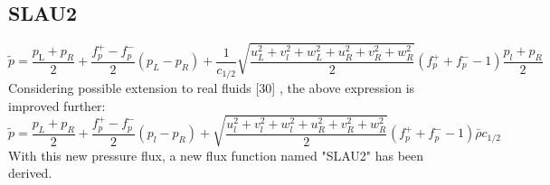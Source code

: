 \subsection{SLAU2}

$$
\tilde{p}=\frac{p_{\mathrm{L}}+p_{R}}{2}+\frac{f_{p}^{+}-f_{p}^{-}}{2}\left(p_{L}-p_{R}\right)+\frac{1}{c_{1 / 2}} \sqrt{\frac{u_{L}^{2}+v_{l}^{2}+w_{L}^{2}+u_{R}^{2}+v_{R}^{2}+w_{R}^{2}}{2}}\left(f_{p}^{+}+f_{p}^{-}-1\right) \frac{p_{l}+p_{R}}{2}
$$
Considering possible extension to real fluids [30] , the above expression is improved further:
$$
\tilde{p}=\frac{p_{L}+p_{R}}{2}+\frac{f_{p}^{+}-f_{p}^{-}}{2}\left(p_{l}-p_{R}\right)+\sqrt{\frac{u_{l}^{2}+v_{l}^{2}+w_{l}^{2}+u_{R}^{2}+v_{R}^{2}+w_{R}^{2}}{2}}\left(f_{p}^{+}+f_{p}^{-}-1\right) \bar{\rho} c_{1 / 2}
$$
With this new pressure flux, a new flux function named "SLAU2" has been derived.
